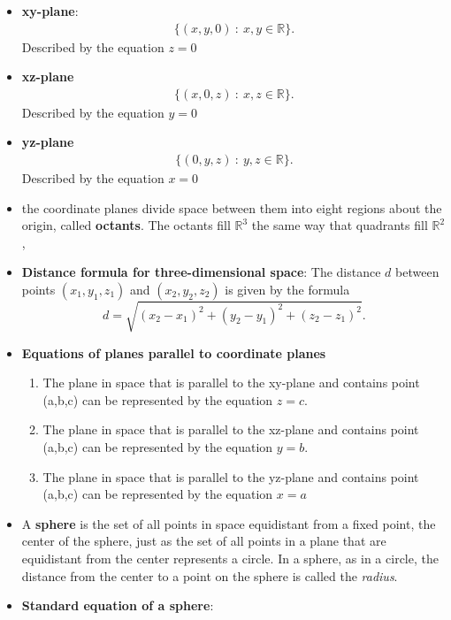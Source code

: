 \documentclass{report}
\begin{document}
\begin{itemize}
    \item \textbf{xy-plane}: 
        \begin{align*}
            \{(x,y,0)\ :\ x,y \in \mathbb{R}\}
        .\end{align*}
        Described by the equation $z=0$
    \item \textbf{xz-plane}
        \begin{align*}
            \{(x,0,z)\ :\ x,z \in \mathbb{R}\}
        .\end{align*}
        Described by the equation $y=0$
    \item \textbf{yz-plane}
        \begin{align*}
            \{(0,y,z)\ :\ y,z \in \mathbb{R}\}
        .\end{align*}
        Described by the equation $x=0$
    \item the coordinate planes divide space between them into eight regions about the origin, called \textbf{octants}. The octants fill  $\mathbb{R}^{3}$ the same way that quadrants fill  $\mathbb{R}^{2}$,
    \item \textbf{Distance formula for three-dimensional space}:
        The distance $d$ between points $(x_1, y_1, z_1)$ and $(x_2, y_2, z_2)$ is given by the formula
        \[
            d = \sqrt{(x_2 - x_1)^2 + (y_2 - y_1)^2 + (z_2 - z_1)^2}.
        \]
    \item \textbf{Equations of planes parallel to coordinate planes}
        \begin{enumerate}
            \item The plane in space that is parallel to the xy-plane and contains point  (a,b,c) can be represented by the equation $z=c$.
            \item The plane in space that is parallel to the xz-plane and contains point  (a,b,c) can be represented by the equation  $y=b$.
            \item The plane in space that is parallel to the yz-plane and contains point  (a,b,c) can be represented by the equation  $x=a$
        \end{enumerate}
    \item         A \textbf{sphere} is the set of all points in space equidistant from a fixed point, the center of the sphere, just as the set of all points in a plane that are equidistant from the center represents a circle. In a sphere, as in a circle, the distance from the center to a point on the sphere is called the \textit{radius}.
    \item \textbf{Standard equation of a sphere}:

\end{itemize}
\end{document}
